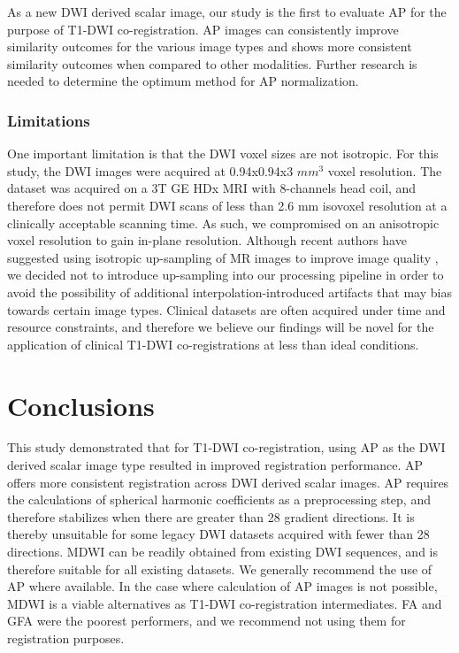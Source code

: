 As a new DWI derived scalar image, our study is the first to evaluate AP for the purpose of T1-DWI co-registration. AP images can consistently improve similarity outcomes for the various image types and shows more consistent similarity outcomes when compared to other modalities. Further research is needed to determine the optimum method for AP normalization. 

\subsubsection{Limitations}

One important limitation is that the DWI voxel sizes are not isotropic. For this study, the DWI images were acquired at 0.94x0.94x3 $mm^3$ voxel resolution. The dataset was acquired on a 3T GE HDx MRI with 8-channels head coil, and therefore does not permit DWI scans of less than 2.6 mm isovoxel resolution at a clinically acceptable scanning time. As such, we compromised on an anisotropic voxel resolution to gain in-plane resolution. Although recent authors have suggested using isotropic up-sampling of MR images to improve image quality \cite{Dyrby2014}, we decided not to introduce up-sampling into our processing pipeline in order to avoid the possibility of additional interpolation-introduced artifacts that may bias towards certain image types.  Clinical datasets are often acquired under time and resource constraints, and therefore we believe our findings will be novel for the application of clinical T1-DWI co-registrations at less than ideal conditions.

\section{Conclusions}
This study demonstrated that for T1-DWI co-registration, using AP as the DWI derived scalar image type resulted in improved registration performance. AP offers more consistent registration across DWI derived scalar images. AP requires the calculations of spherical harmonic coefficients as a preprocessing step, and therefore stabilizes when there are greater than 28 gradient directions. It is thereby unsuitable for some legacy DWI datasets acquired with fewer than 28 directions. MDWI can be readily obtained from existing DWI sequences, and is therefore suitable for all existing datasets. We generally recommend the use of AP where available. In the case where calculation of AP images is not possible, MDWI is a viable alternatives as T1-DWI co-registration intermediates. FA and GFA were the poorest performers, and we recommend not using them for registration purposes.

